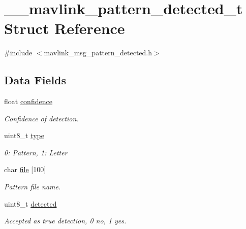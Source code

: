 \hypertarget{struct____mavlink__pattern__detected__t}{\section{\+\_\+\+\_\+mavlink\+\_\+pattern\+\_\+detected\+\_\+t Struct Reference}
\label{struct____mavlink__pattern__detected__t}
}


{\ttfamily \#include $<$mavlink\+\_\+msg\+\_\+pattern\+\_\+detected.\+h$>$}

\subsection*{Data Fields}
\begin{DoxyCompactItemize}
\item 
float \hyperlink{struct____mavlink__pattern__detected__t_ad410e2d21aa4517d9122a7c1637a6ac3}{confidence}
\begin{DoxyCompactList}\small\item\em Confidence of detection. \end{DoxyCompactList}\item 
uint8\+\_\+t \hyperlink{struct____mavlink__pattern__detected__t_abb86b1f357c9d13fea4bbb680297bd64}{type}
\begin{DoxyCompactList}\small\item\em 0\+: Pattern, 1\+: Letter \end{DoxyCompactList}\item 
char \hyperlink{struct____mavlink__pattern__detected__t_a963eb779046c9c36e4ea3566cc8afa3e}{file} \mbox{[}100\mbox{]}
\begin{DoxyCompactList}\small\item\em Pattern file name. \end{DoxyCompactList}\item 
uint8\+\_\+t \hyperlink{struct____mavlink__pattern__detected__t_a308a87829e1c1d864ef3e0ccb7eedbe0}{detected}
\begin{DoxyCompactList}\small\item\em Accepted as true detection, 0 no, 1 yes. \end{DoxyCompactList}\end{DoxyCompactItemize}


